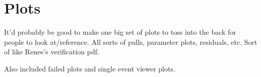 \section{Plots}
\label{sec:Plots}

It'd probably be good to make one big set of plots to toss into the back for people to look at/reference. All sorts of pulls, parameter plots, residuals, etc. Sort of like Renee's verification pdf.

Also included failed plots and single event viewer plots.
